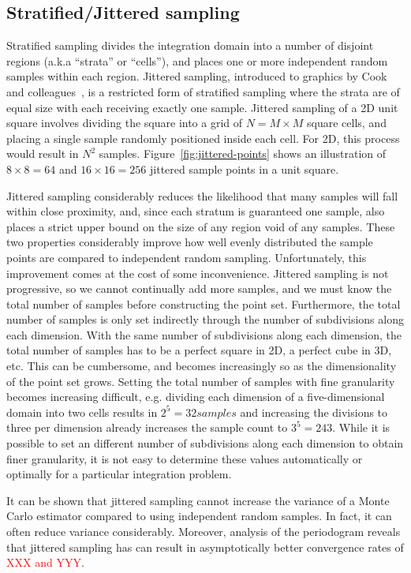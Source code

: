 \documentclass[11pt,fleqn]{book} %
\begin{document}
\subsection{Stratified/Jittered sampling}
Stratified sampling divides the integration domain into a number of disjoint regions (a.k.a ``strata'' or ``cells''), and places one or more independent random samples within each region. Jittered sampling, introduced to graphics by Cook and colleagues~\cite{Cook:1986:SSC}, is a restricted form of stratified sampling where the strata are of equal size with each receiving exactly one sample. Jittered sampling of a 2D unit square involves dividing the square into a grid of $N = M\times M$ square cells, and placing a single sample randomly positioned inside each cell. For 2D, this process would result in $N^2$ samples. Figure~\ref{fig:jittered-points} shows an illustration of $8\times8 =64$ and $16\times16 = 256$ jittered sample points in a unit square.

Jittered sampling considerably reduces the likelihood that many samples will fall within close proximity, and, since each stratum is guaranteed one sample, also places a strict upper bound on the size of any region void of any samples. These two properties considerably improve how well evenly distributed the sample points are compared to independent random sampling. Unfortunately, this improvement comes at the cost of some inconvenience. Jittered sampling is not progressive, so we cannot continually add more samples, and we must know the total number of samples before constructing the point set. Furthermore, the total number of samples is only set indirectly through the number of subdivisions along each dimension. With the same number of subdivisions along each dimension, the total number of samples has to be a perfect square in 2D, a perfect cube in 3D, etc. This can be cumbersome, and becomes increasingly so as the dimensionality of the point set grows. Setting the total number of samples with fine granularity becomes increasing difficult, e.g. dividing each dimension of a five-dimensional domain into two cells results in $2^5 = 32 samples$ and increasing the divisions to three per dimension already increases the sample count to $3^5 = 243$. While it is possible to set an different number of subdivisions along each dimension to obtain finer granularity, it is not easy to determine these values automatically or optimally for a particular integration problem.

It can be shown that jittered sampling cannot increase the variance of a Monte Carlo estimator compared to using independent random samples. In fact, it can often reduce variance considerably. Moreover, analysis of the periodogram reveals that jittered sampling has can result in asymptotically better convergence rates of \textcolor{red}{XXX and YYY}.
\end{document}
